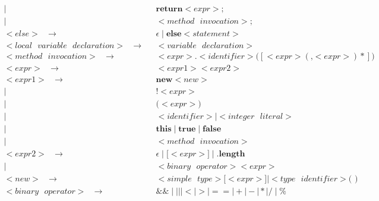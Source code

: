\documentclass[a4paper,12pt]{article}
\newcommand{\bb}[1]{\textbf{#1}}
\newcommand{\s}{\text{ }}
\begin{document}
\begin{align*}
             \mid \s &\bb{return} <expr> \bb{;}  \\
             \mid \s &<method\s invocation> \bb{;} \\
<else>\s \to \s &\epsilon \mid \bb{else} <statement> \\
<local\s variable\s declaration> \s \to \s &<variable\s declaration> \\
<method\s invocation>\s \to \s &<expr> \bb{.} <identifier> \bb{(} [ <expr> (\bb{,} <expr>)* ] \bb{)} \\
\hline
<expr>\s \to \s &<expr1><expr2> \\
<expr1>\s \to \s &\bb{new} <new>\\
    \mid \s    &\bb{!} <expr> \\
    \mid \s    &\bb{(} <expr> \bb{)} \\
    \mid \s    &<identifier> \mid <integer\s literal> \\
    \mid \s    &\bb{this} \mid \bb{true} \mid \bb{false} \\
    \mid \s    &<method\s invocation> \\
<expr2>\s \to \s &\epsilon \mid \bb{[} <expr> \bb{]} \mid \bb{.length}\\
    \mid \s    &<binary\s operator> <expr> \\
<new>\s \to \s &<simple\s type> \bb{[} <expr> \bb{]} \mid <type\s identifier> \bb{( )} \\ 
<binary\s operator>\s \to \s & \&\& \mid || \mid < \mid > \mid == \mid + \mid - \mid * \mid / \mid \% 
\end{align*}
\endgroup
\end{document}
